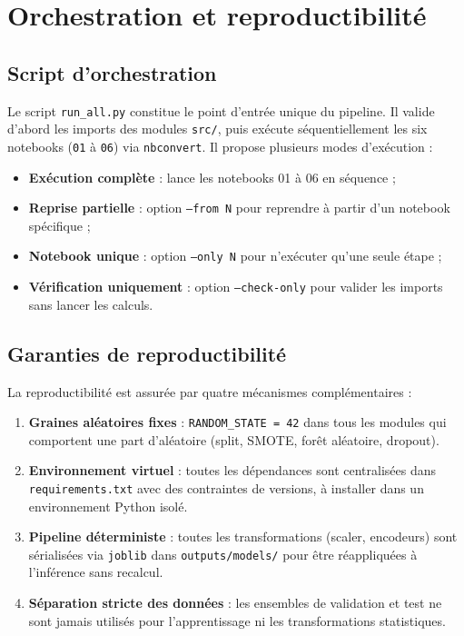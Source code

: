 \section{Orchestration et reproductibilité}

\subsection{Script d'orchestration}

Le script \texttt{run\_all.py} constitue le point d'entrée unique du pipeline. Il valide
d'abord les imports des modules \texttt{src/}, puis exécute séquentiellement les six
notebooks (\texttt{01} à \texttt{06}) via \texttt{nbconvert}. Il propose plusieurs
modes d'exécution :

\begin{itemize}
  \item \textbf{Exécution complète} : lance les notebooks 01 à 06 en séquence ;
  \item \textbf{Reprise partielle} : option \texttt{--from N} pour reprendre à partir
    d'un notebook spécifique ;
  \item \textbf{Notebook unique} : option \texttt{--only N} pour n'exécuter qu'une seule
    étape ;
  \item \textbf{Vérification uniquement} : option \texttt{--check-only} pour valider
    les imports sans lancer les calculs.
\end{itemize}

\subsection{Garanties de reproductibilité}

La reproductibilité est assurée par quatre mécanismes complémentaires :

\begin{enumerate}
  \item \textbf{Graines aléatoires fixes} : \texttt{RANDOM\_STATE = 42} dans tous les
    modules qui comportent une part d'aléatoire (split, SMOTE, forêt aléatoire, dropout).
  \item \textbf{Environnement virtuel} : toutes les dépendances sont centralisées dans
    \texttt{requirements.txt} avec des contraintes de versions, à installer dans un
    environnement Python isolé.
  \item \textbf{Pipeline déterministe} : toutes les transformations (scaler, encodeurs)
    sont sérialisées via \texttt{joblib} dans \texttt{outputs/models/} pour être
    réappliquées à l'inférence sans recalcul.
  \item \textbf{Séparation stricte des données} : les ensembles de validation et test
    ne sont jamais utilisés pour l'apprentissage ni les transformations statistiques.
\end{enumerate}

